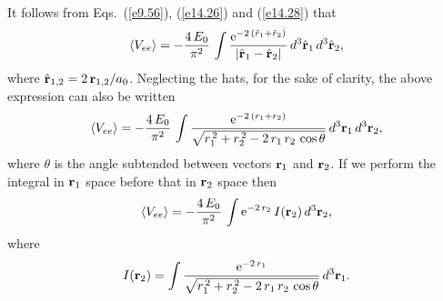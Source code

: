 It follows from Eqs.~(\ref{e9.56}), (\ref{e14.26}) and (\ref{e14.28}) that
\begin{equation}
\langle V_{ee}\rangle = -\frac{4\,E_0}{\pi^2}\,\int
\frac{{\rm e}^{-2\,(\hat{r}_1+ \hat{r}_2)}}{|\hat{\bf r}_1-\hat{\bf r}_2|}\,d^3\hat{\bf r}_1\,d^3\hat{\bf r}_2,
\end{equation}
where $\hat{\bf r}_{1,2} = 2\, {\bf r}_{1,2}/a_0$. Neglecting the hats, for the sake of clarity, the above
expression can also be written
\begin{equation}
\langle V_{ee}\rangle = -\frac{4\,E_0}{\pi^2}\,\int
\frac{{\rm e}^{-2\,(r_1+ r_2)}}{\sqrt{r_1^{\,2}+r_2^{\,2}-2\,r_1\,r_2\,\cos\theta}}\,d^3{\bf r}_1\,d^3{\bf r}_2,
\end{equation}
where $\theta$ is the angle subtended between vectors ${\bf r}_1$ and ${\bf r}_2$.
If we perform the integral in ${\bf r}_1$ space before that in ${\bf r}_2$
space then
\begin{equation}\label{e14.31}
\langle V_{ee}\rangle =  -\frac{4\,E_0}{\pi^2}\,\int {\rm e}^{-2\,r_2}\,I({\bf r}_2)\,d^3{\bf r}_2,
\end{equation}
where
\begin{equation}
I({\bf r}_2) = \int \frac{{\rm e}^{-2\,r_1}}{\sqrt{r_1^{\,2}+r_2^{\,2}-2\,r_1\,r_2\,\cos\theta}}\,d^3{\bf r}_1.
\end{equation}

